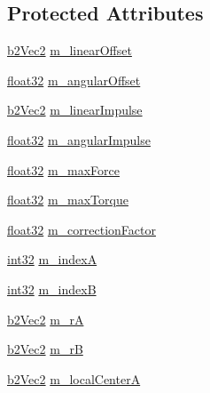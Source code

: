 \subsection*{Protected Attributes}
\begin{DoxyCompactItemize}
\item 
\mbox{\hyperlink{structb2_vec2}{b2\+Vec2}} \mbox{\hyperlink{classb2_motor_joint_a6e8db2001da3a9b2926a41451f28f73b}{m\+\_\+linear\+Offset}}
\item 
\mbox{\hyperlink{b2_settings_8h_aacdc525d6f7bddb3ae95d5c311bd06a1}{float32}} \mbox{\hyperlink{classb2_motor_joint_ac48f242920da2d2678dea09941c3d31c}{m\+\_\+angular\+Offset}}
\item 
\mbox{\hyperlink{structb2_vec2}{b2\+Vec2}} \mbox{\hyperlink{classb2_motor_joint_a5aba4dbf8cccc33a1cc20f7a503b51f5}{m\+\_\+linear\+Impulse}}
\item 
\mbox{\hyperlink{b2_settings_8h_aacdc525d6f7bddb3ae95d5c311bd06a1}{float32}} \mbox{\hyperlink{classb2_motor_joint_abf23ffd98f99bdf34423bee99e40a949}{m\+\_\+angular\+Impulse}}
\item 
\mbox{\hyperlink{b2_settings_8h_aacdc525d6f7bddb3ae95d5c311bd06a1}{float32}} \mbox{\hyperlink{classb2_motor_joint_ad9a39349f3b43e8f1c33f5a44575dffe}{m\+\_\+max\+Force}}
\item 
\mbox{\hyperlink{b2_settings_8h_aacdc525d6f7bddb3ae95d5c311bd06a1}{float32}} \mbox{\hyperlink{classb2_motor_joint_a7c0c777bb6d78f3eff9abb8819ddb14f}{m\+\_\+max\+Torque}}
\item 
\mbox{\hyperlink{b2_settings_8h_aacdc525d6f7bddb3ae95d5c311bd06a1}{float32}} \mbox{\hyperlink{classb2_motor_joint_a5e42eef05987dd269be1e709172b933c}{m\+\_\+correction\+Factor}}
\item 
\mbox{\hyperlink{b2_settings_8h_a43d43196463bde49cb067f5c20ab8481}{int32}} \mbox{\hyperlink{classb2_motor_joint_afdd9d0ebe37506dd8509ed2392fa1f56}{m\+\_\+indexA}}
\item 
\mbox{\hyperlink{b2_settings_8h_a43d43196463bde49cb067f5c20ab8481}{int32}} \mbox{\hyperlink{classb2_motor_joint_a51525d3f5af31dcede8e641943fe86b3}{m\+\_\+indexB}}
\item 
\mbox{\hyperlink{structb2_vec2}{b2\+Vec2}} \mbox{\hyperlink{classb2_motor_joint_a0340ef47abad9882a271be45df15d3ed}{m\+\_\+rA}}
\item 
\mbox{\hyperlink{structb2_vec2}{b2\+Vec2}} \mbox{\hyperlink{classb2_motor_joint_a85c605b404e4b087e2932fdf23b447d5}{m\+\_\+rB}}
\item 
\mbox{\hyperlink{structb2_vec2}{b2\+Vec2}} \mbox{\hyperlink{classb2_motor_joint_a42f50bbd4b5821164c9777903c83a723}{m\+\_\+local\+CenterA}}

\end{DoxyCompactItemize}

